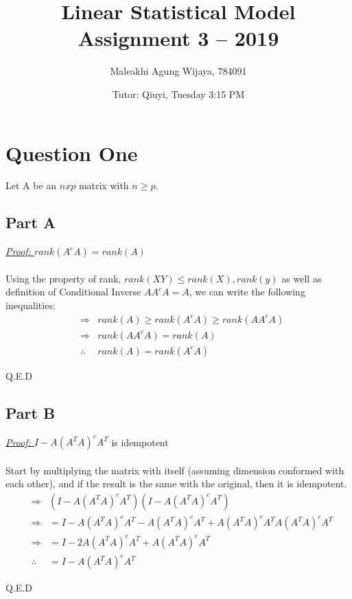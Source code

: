 \documentclass{article}
\title{Linear Statistical Model Assignment 3 -- 2019}
\author{Maleakhi Agung Wijaya, 784091}
\date{Tutor: Qiuyi, Tuesday 3:15 PM}
\begin{document}
\maketitle


\section{Question One}
Let A be an $nxp$ matrix with $n \geq p$.

\subsection{Part A}
\textit{\underline{Proof: }} $rank(A^cA) = rank(A)$ \\ \\
Using the property of rank, $rank(XY) \leq rank(X), rank(y)$ as well as definition of Conditional Inverse $AA^cA = A$, we can write the following inequalities:
\begin{eqnarray*}
  &\Rightarrow& rank(A) \geq rank(A^cA) \geq rank(AA^cA) \\
  &\Rightarrow& rank(AA^cA) = rank(A) \\
  &\therefore& rank(A) = rank(A^cA)
\end{eqnarray*}

\begin{flushright}
Q.E.D
\end{flushright}

\subsection{Part B}
\textit{\underline{Proof: }} $I - A(A^TA)^cA^T$ is idempotent \\ \\
Start by multiplying the matrix with itself (assuming dimension conformed with each other), and if the result is the same with the original, then it is idempotent.
\begin{eqnarray*}
  &\Rightarrow& (I - A(A^TA)^cA^T)(I - A(A^TA)^cA^T) \\
  &\Rightarrow& = I - A(A^TA)^cA^T - A(A^TA)^cA^T + A(A^TA)^cA^TA(A^TA)^cA^T \\
  &\Rightarrow& = I - 2A(A^TA)^cA^T + A(A^TA)^cA^T \\
  &\therefore& = I - A(A^TA)^cA^T
\end{eqnarray*}

\begin{flushright}
Q.E.D
\end{flushright}
\end{document}
